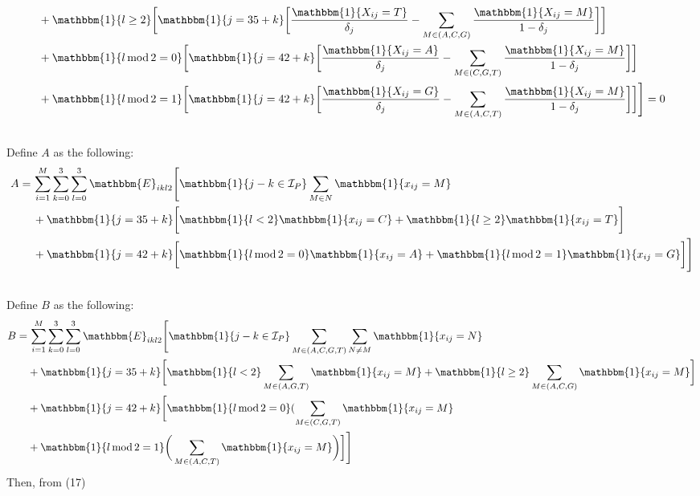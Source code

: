 \documentclass[10pt]{article}
\begin{document}
\begin{enumerate}[label = \textbf{\arabic*.}]
\begin{align}
            &+\mathbbm{1}\{l \geq 2\}\bigg[\mathbbm{1}\{j=35+k\}\bigg[\frac{\mathbbm{1}\{X_{ij}=T\}}{\delta_j} - \sum_{M \in (A,C,G)}\frac{\mathbbm{1}\{X_{ij}=M\}}{1-\delta_j} \bigg] \bigg]\\\nonumber
            &+\mathbbm{1}\{l\,\mathrm{mod}\,2 = 0\}\bigg[\mathbbm{1}\{j=42+k\}\bigg[\frac{\mathbbm{1}\{X_{ij}=A\}}{\delta_j} - \sum_{M \in (C,G,T)}\frac{\mathbbm{1}\{X_{ij}=M\}}{1-\delta_j} \bigg] \bigg]\\\nonumber
            &+\mathbbm{1}\{l\,\mathrm{mod}\,2 = 1\}\bigg[\mathbbm{1}\{j=42+k\}\bigg[\frac{\mathbbm{1}\{X_{ij}=G\}}{\delta_j} - \sum_{M \in (A,C,T)}\frac{\mathbbm{1}\{X_{ij}=M\}}{1-\delta_j} \bigg] \bigg]\Bigg]=0\\\nonumber
        \end{align}
        Define $A$ as the following:
        \begin{align}
            A = \,&\sum_{i=1}^{M}\sum_{k=0}^3\sum_{l=0}^3\mathbbm{E}_{ikl2}\Bigg[\mathbbm{1}\{j - k \in \mathcal{I}_P\}\sum_{M \in N}\mathbbm{1}\{x_{ij}=M\}\nonumber\\\nonumber
            &+\mathbbm{1}\{j=35+k\}\bigg[\mathbbm{1}\{l<2\}\mathbbm{1}\{x_{ij}=C\}+\mathbbm{1}\{l\geq2\}\mathbbm{1}\{x_{ij}=T\}\bigg]\nonumber\\\nonumber
            &+\mathbbm{1}\{j=42+k\}\bigg[\mathbbm{1}\{l\,\mathrm{mod}\,2 = 0\}\mathbbm{1}\{x_{ij}=A\} + \mathbbm{1}\{l\,\mathrm{mod}\,2 = 1\}\mathbbm{1}\{x_{ij}=G\} \bigg]\Bigg]\\\nonumber
        \end{align}
        Define $B$ as the following:
        \begin{align}
            B = &\,\sum_{i=1}^{M}\sum_{k=0}^3\sum_{l=0}^3\mathbbm{E}_{ikl2}\Bigg[\mathbbm{1}\{j - k \in \mathcal{I}_P\}\sum_{M \in (A,C,G,T)}\sum_{N \neq M}\mathbbm{1}\{x_{ij}=N\}\\\nonumber
            &+\mathbbm{1}\{j=35+k\}\bigg[\mathbbm{1}\{l<2\}\sum_{M \in (A,G,T)}\mathbbm{1}\{x_{ij}=M\}+\mathbbm{1}\{l\geq2\}\sum_{M \in (A,C,G)}\mathbbm{1}\{x_{ij}=M\} \bigg]\nonumber\\
            &+\mathbbm{1}\{j=42+k\}\bigg[\mathbbm{1}\{l\,\mathrm{mod}\,2 = 0\}(\sum_{M \in (C,G,T)}\mathbbm{1}\{x_{ij}=M\} \nonumber\\
            &+ \mathbbm{1}\{l\,\mathrm{mod}\,2 = 1\}\bigg(\sum_{M \in (A,C,T)}\mathbbm{1}\{x_{ij}=M\}\bigg) \bigg]\Bigg]\nonumber
        \end{align}
        Then, from (17)
        \begin{align}

\end{align}
\end{enumerate}
\end{document}
